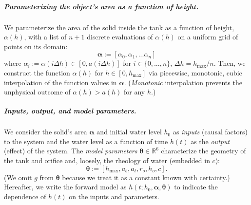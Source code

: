 \documentclass[openacc]{rsproca_new}%
\newcommand\themodel {$h(t; h_0, \boldsymbol \alpha, \boldsymbol\theta)$\xspace}
\begin{document}
\vspace{-\baselineskip}
\subparagraph{Parameterizing the object's area as a function of height.}
We parameterize the area of the solid inside the tank as a function of height, $\alpha(h)$, with a list of $n+1$ discrete evaluations of $\alpha(h)$ on a uniform grid of points on its domain:
\begin{equation}
	\boldsymbol \alpha := [\alpha_0, \alpha_1, ... \alpha_n] \label{eq:alpha}
\end{equation}
where $\alpha_i :=\alpha(i \Delta h) \in [0, a(i\Delta h)] $ for $i \in \{0, ..., n\}$, $\Delta h = h_{\text{max}}/n$. Then, we construct the function $\alpha(h)$ for $h\in [0, h_{\text{max}}]$ via piecewise, monotonic, cubic interpolation \cite{fritsch1984method} of the function values in $\boldsymbol \alpha$. (\emph{Monotonic} interpolation prevents the unphysical outcome of $\alpha(h) > a(h)$ for any $h$.) 

\vspace{-\baselineskip}
\subparagraph{Inputs, output, and model parameters.} 
We
consider the solid's area $\boldsymbol \alpha$ and initial water level $h_0$ as \emph{inputs} (causal factors) to the system and the water level as a function of time $h(t)$ as the \emph{output} (effect) of the system.
The \emph{model parameters} $\boldsymbol \theta \in \mathbb{R}^6$ characterize the geometry of the tank and orifice and, loosely, the rheology of water (embedded in $c$):
\begin{equation}
	\boldsymbol \theta := [h_{\text{max}}, a_b, a_t, r_o, h_o, c]. \label{eq:theta}
\end{equation}
(We omit $g$ from $\boldsymbol \theta$ because we treat it as a constant known with certainty.)
Hereafter, we write the forward model as \themodel to indicate the dependence of $h(t)$ on the inputs and parameters.
\end{document}
